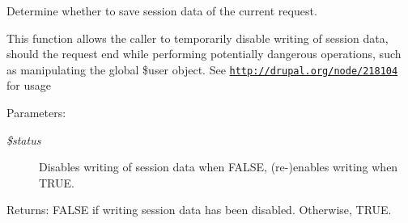 Determine whether to save session data of the current request.

This function allows the caller to temporarily disable writing of session data, should the request end while performing potentially dangerous operations, such as manipulating the global \$user object. See \href{http://drupal.org/node/218104}{\tt http://drupal.org/node/218104} for usage

\begin{Desc}
\item[Parameters:]
\begin{description}
\item[{\em \$status}]Disables writing of session data when FALSE, (re-)enables writing when TRUE. \end{description}
\end{Desc}
\begin{Desc}
\item[Returns:]FALSE if writing session data has been disabled. Otherwise, TRUE. \end{Desc}
